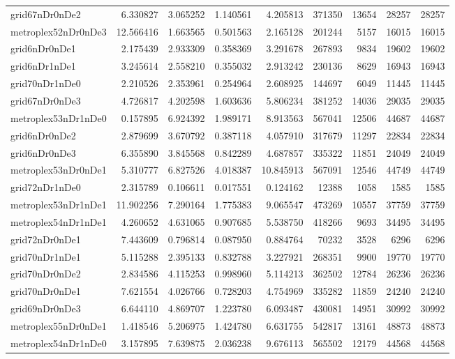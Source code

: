 \begin{longtable}{|l|r|r|r|r|r|r|r|r|}
grid67nDr0nDe2 & 6.330827 & 3.065252 & 1.140561 & 4.205813 & 371350 & 13654 & 28257 & 28257 \\
metroplex52nDr0nDe3 & 12.566416 & 1.663565 & 0.501563 & 2.165128 & 201244 & 5157 & 16015 & 16015 \\
grid6nDr0nDe1 & 2.175439 & 2.933309 & 0.358369 & 3.291678 & 267893 & 9834 & 19602 & 19602 \\
grid6nDr1nDe1 & 3.245614 & 2.558210 & 0.355032 & 2.913242 & 230136 & 8629 & 16943 & 16943 \\
grid70nDr1nDe0 & 2.210526 & 2.353961 & 0.254964 & 2.608925 & 144697 & 6049 & 11445 & 11445 \\
grid67nDr0nDe3 & 4.726817 & 4.202598 & 1.603636 & 5.806234 & 381252 & 14036 & 29035 & 29035 \\
metroplex53nDr1nDe0 & 0.157895 & 6.924392 & 1.989171 & 8.913563 & 567041 & 12506 & 44687 & 44687 \\
grid6nDr0nDe2 & 2.879699 & 3.670792 & 0.387118 & 4.057910 & 317679 & 11297 & 22834 & 22834 \\
grid6nDr0nDe3 & 6.355890 & 3.845568 & 0.842289 & 4.687857 & 335322 & 11851 & 24049 & 24049 \\
metroplex53nDr0nDe1 & 5.310777 & 6.827526 & 4.018387 & 10.845913 & 567091 & 12546 & 44749 & 44749 \\
grid72nDr1nDe0 & 2.315789 & 0.106611 & 0.017551 & 0.124162 & 12388 & 1058 & 1585 & 1585 \\
metroplex53nDr1nDe1 & 11.902256 & 7.290164 & 1.775383 & 9.065547 & 473269 & 10557 & 37759 & 37759 \\
metroplex54nDr1nDe1 & 4.260652 & 4.631065 & 0.907685 & 5.538750 & 418266 & 9693 & 34495 & 34495 \\
grid72nDr0nDe1 & 7.443609 & 0.796814 & 0.087950 & 0.884764 & 70232 & 3528 & 6296 & 6296 \\
grid70nDr1nDe1 & 5.115288 & 2.395133 & 0.832788 & 3.227921 & 268351 & 9900 & 19770 & 19770 \\
grid70nDr0nDe2 & 2.834586 & 4.115253 & 0.998960 & 5.114213 & 362502 & 12784 & 26236 & 26236 \\
grid70nDr0nDe1 & 7.621554 & 4.026766 & 0.728203 & 4.754969 & 335282 & 11859 & 24240 & 24240 \\
grid69nDr0nDe3 & 6.644110 & 4.869707 & 1.223780 & 6.093487 & 430081 & 14951 & 30992 & 30992 \\
metroplex55nDr0nDe1 & 1.418546 & 5.206975 & 1.424780 & 6.631755 & 542817 & 13161 & 48873 & 48873 \\
metroplex54nDr1nDe0 & 3.157895 & 7.639875 & 2.036238 & 9.676113 & 565502 & 12179 & 44568 & 44568 \\

\end{longtable}
